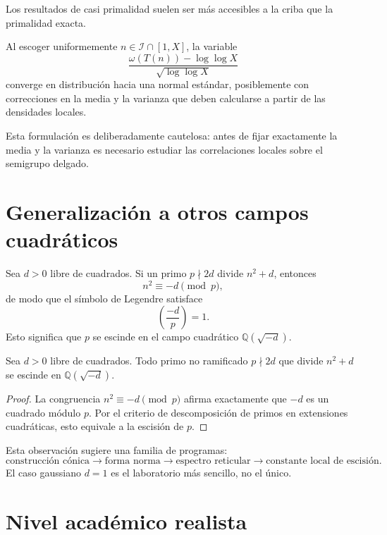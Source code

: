 \documentclass[11pt,a4paper,openany]{report}
\newcommand{\Q}{\mathbb{Q}}
\newcommand{\Iset}{\mathcal{I}}
\begin{document}
Los resultados de casi primalidad suelen ser más accesibles a la criba que la primalidad exacta.

\begin{conjecture}
Al escoger uniformemente \(n\in\Iset\cap[1,X]\), la variable
\[
 \frac{\omega(T(n))-\log\log X}{\sqrt{\log\log X}}
\]
converge en distribución hacia una normal estándar, posiblemente con correcciones en la media y la varianza que deben calcularse a partir de las densidades locales.
\end{conjecture}

Esta formulación es deliberadamente cautelosa: antes de fijar exactamente la media y la varianza es necesario estudiar las correlaciones locales sobre el semigrupo delgado.

\section{Generalización a otros campos cuadráticos}

Sea \(d>0\) libre de cuadrados. Si un primo \(p\nmid2d\) divide \(n^2+d\), entonces
\[
 n^2\equiv-d\pmod p,
\]
de modo que el símbolo de Legendre satisface
\[
 \left(\frac{-d}{p}\right)=1.
\]
Esto significa que \(p\) se escinde en el campo cuadrático \(\Q(\sqrt{-d})\).

\begin{theorem}
Sea \(d>0\) libre de cuadrados. Todo primo no ramificado \(p\nmid2d\) que divide \(n^2+d\) se escinde en \(\Q(\sqrt{-d})\).
\end{theorem}

\begin{proof}
La congruencia \(n^2\equiv-d\pmod p\) afirma exactamente que \(-d\) es un cuadrado módulo \(p\). Por el criterio de descomposición de primos en extensiones cuadráticas, esto equivale a la escisión de \(p\).
\end{proof}

Esta observación sugiere una familia de programas:
\[
 \text{construcción cónica}
 \longrightarrow
 \text{forma norma}
 \longrightarrow
 \text{espectro reticular}
 \longrightarrow
 \text{constante local de escisión}.
\]
El caso gaussiano \(d=1\) es el laboratorio más sencillo, no el único.

\section{Nivel académico realista}
\end{document}
